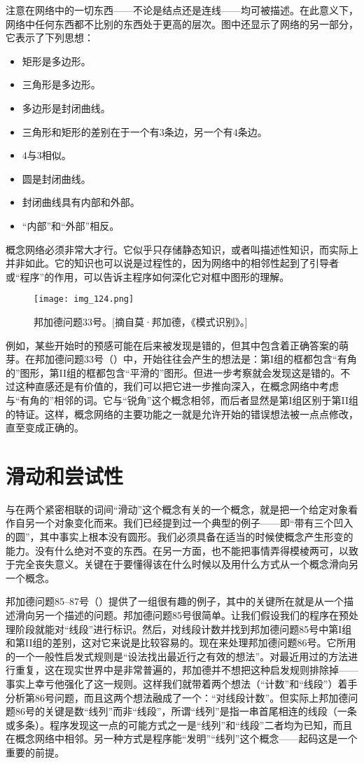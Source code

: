 注意在网络中的一切东西——不论是结点还是连线——均可被描述。在此意义下，网络中任何东西都不比别的东西处于更高的层次。图中还显示了网络的另一部分，它表示了下列思想：
\begin{itemize}
\item 矩形是多边形。
\item 三角形是多边形。
\item 多边形是封闭曲线。
\item 三角形和矩形的差别在于一个有$3$条边，另一个有$4$条边。
\item $4$与$3$相似。
\item 圆是封闭曲线。
\item 封闭曲线具有内部和外部。
\item “内部”和“外部”相反。
\end{itemize}

概念网络必须非常大才行。它似乎只存储静态知识，或者叫描述性知识，而实际上并非如此。它的知识也可以说是过程性的，因为网络中的相邻性起到了引导者或“程序”的作用，可以告诉主程序如何深化它对框中图形的理解。

\begin{figure}
\texttt{[image: img\_124.png]}
\caption[邦加德问题33号。]
  {邦加德问题33号。[摘自莫·邦加德，《模式识别》。] }
\end{figure}

例如，某些开始时的预感可能在后来被发现是错的，但其中包含着正确答案的萌芽。在邦加德问题33号（）中，开始往往会产生的想法是：第I组的框都包含“有角的”图形，第II组的框都包含“平滑的”图形。但进一步考察就会发现这是错的。不过这种直感还是有价值的，我们可以把它进一步推向深入，在概念网络中考虑与“有角的”相邻的词。它与“锐角”这个概念相邻，而后者显然是第I组区别于第II组的特证。这样，概念网络的主要功能之一就是允许开始的错误想法被一点点修改，直至变成正确的。

\section{滑动和尝试性}

与在两个紧密相联的词间“滑动”这个概念有关的一个概念，就是把一个给定对象看作自另一个对象变化而来。我们已经提到过一个典型的例子——即“带有三个凹入的圆”，其中事实上根本没有圆形。我们必须具备在适当的时候使概念产生形变的能力。没有什么绝对不变的东西。在另一方面，也不能把事情弄得模棱两可，以致于完全丧失意义。关键在于要懂得该在什么时候以及用什么方式从一个概念滑向另一个概念。

邦加德问题85--87号（）提供了一组很有趣的例子，其中的关键所在就是从一个描述滑向另一个描述的问题。邦加德问题85号很简单。让我们假设我们的程序在预处理阶段就能对“线段”进行标识。然后，对线段计数并找到邦加德问题85号中第I组和第II组的差别，这对它来说是比较容易的。现在来处理邦加德问题86号。它所用的一个一般性启发式规则是“设法找出最近行之有效的想法”。对最近用过的方法进行重复，这在现实世界中是非常普遍的，邦加德并不想把这种启发规则排除掉——事实上幸亏他强化了这一规则。这样我们就带着两个想法（“计数”和“线段”）着手分析第86号问题，而且这两个想法融成了一个：“对线段计数”。但实际上邦加德问题86号的关键是数“线列”而非“线段”，所谓“线列”是指一串首尾相连的线段（一条或多条）。程序发现这一点的可能方式之一是“线列”和“线段”二者均为已知，而且在概念网络中相邻。另一种方式是程序能“发明”“线列”这个概念——起码这是一个重要的前提。

